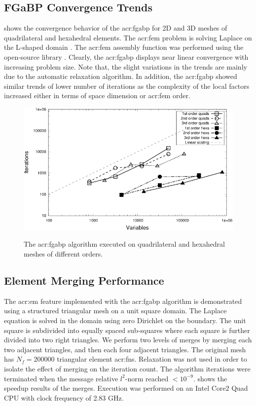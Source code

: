 \subsection{FGaBP Convergence Trends}
 shows the convergence behavior of the \gls{acr:fgabp} for 2D and 3D meshes of quadrilateral and hexahedral elements.
The \gls{acr:fem} problem is solving Laplace on the L-shaped domain .
The \gls{acr:fem} assembly function was performed using the open-source library \dealName{} \cite{bib:dealii2007}.
Clearly, the \gls{acr:fgabp} displays near linear convergence with increasing problem size.
Note that, the slight variations in the trends are mainly due to the automatic relaxation algorithm.
In addition, the \gls{acr:fgabp} showed similar trends of lower number of iterations as the complexity of the local factors increased either in terms of space dimension or \gls{acr:fem} order.

\begin{figure}
	\centering
	{%
	\includegraphics[scale=1.2]{FGaBP_itrs}
	}
	\caption{The \acrshort{acr:fgabp} algorithm executed on quadrilateral and hexahedral meshes of different orders.}
	\label{fig:fgabpItr}
\end{figure}


\subsection{Element Merging Performance}
\label{sec:elmMergRes}

The \gls{acr:em} feature implemented with the \gls{acr:fgabp} algorithm is demonstrated using a structured triangular mesh on a unit square domain.
The Laplace equation is solved in the domain using zero Dirichlet on the boundary.
The unit square is subdivided into equally spaced sub-squares where each square is further divided into two right triangles.
We perform two levels of merges by merging each two adjacent triangles, and then each four adjacent triangles.
The original mesh has $N_f=200000$ triangular element \glspl{acr:fn}.
Relaxation was not used in order to isolate the effect of merging on the iteration count.
The algorithm iterations were terminated when the message relative $l^2$-norm reached $<10^{-9}$.
 shows the speedup results of the merges.
Execution was performed on an Intel Core2 Quad CPU with clock frequency of 2.83 GHz.


